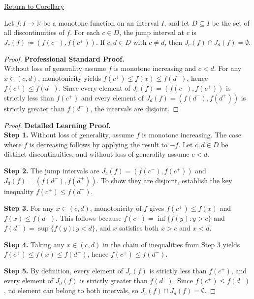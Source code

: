 \newpage
{}
\label{prf:jump-intervals-for-monotone-discontinuities}

\begin{remark*}[Return]
\hyperref[cor:jump-intervals-for-monotone-discontinuities]{Return to Corollary}
\end{remark*}

\begin{theorem*}
Let $f : I \to \mathbb{R}$ be a monotone function on an interval $I$, and let $D \subseteq I$ be the set of all discontinuities of $f$. For each $c \in D$, the jump interval at $c$ is $J_c(f) \coloneqq (f(c^{-}), f(c^{+}))$. If $c, d \in D$ with $c \neq d$, then $J_c(f) \cap J_d(f) = \emptyset$.
\end{theorem*}

\begin{proof}
\textbf{Professional Standard Proof.}~\\
Without loss of generality assume $f$ is monotone increasing and $c < d$. For any $x \in (c, d)$, monotonicity yields $f(c^{+}) \leq f(x) \leq f(d^{-})$, hence $f(c^{+}) \leq f(d^{-})$. Since every element of $J_c(f) = (f(c^{-}), f(c^{+}))$ is strictly less than $f(c^{+})$ and every element of $J_d(f) = (f(d^{-}), f(d^{+}))$ is strictly greater than $f(d^{-})$, the intervals are disjoint.
\end{proof}

\begin{proof}
\textbf{Detailed Learning Proof.}~\\

\textbf{Step 1.} Without loss of generality, assume $f$ is monotone increasing. The case where $f$ is decreasing follows by applying the result to $-f$. Let $c, d \in D$ be distinct discontinuities, and without loss of generality assume $c < d$.

\textbf{Step 2.} The jump intervals are $J_c(f) = (f(c^{-}), f(c^{+}))$ and $J_d(f) = (f(d^{-}), f(d^{+}))$. To show they are disjoint, establish the key inequality $f(c^{+}) \leq f(d^{-})$.

\textbf{Step 3.} For any $x \in (c, d)$, monotonicity of $f$ gives $f(c^{+}) \leq f(x)$ and $f(x) \leq f(d^{-})$. This follows because $f(c^{+}) = \inf\{f(y) : y > c\}$ and $f(d^{-}) = \sup\{f(y) : y < d\}$, and $x$ satisfies both $x > c$ and $x < d$.

\textbf{Step 4.} Taking any $x \in (c, d)$ in the chain of inequalities from Step 3 yields $f(c^{+}) \leq f(x) \leq f(d^{-})$, hence $f(c^{+}) \leq f(d^{-})$.

\textbf{Step 5.} By definition, every element of $J_c(f)$ is strictly less than $f(c^{+})$, and every element of $J_d(f)$ is strictly greater than $f(d^{-})$. Since $f(c^{+}) \leq f(d^{-})$, no element can belong to both intervals, so $J_c(f) \cap J_d(f) = \emptyset$.
\end{proof}

